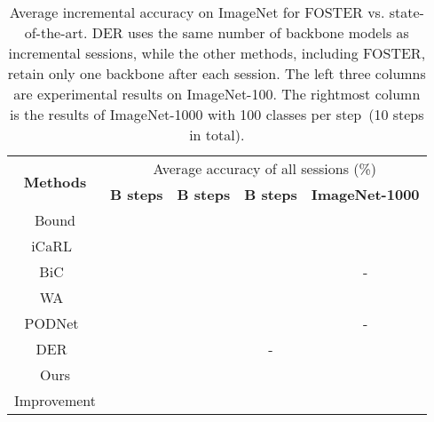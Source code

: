 \documentclass[runningheads]{llncs}
\begin{document}
\begin{table}[t]
\centering
\caption{\small  Average incremental accuracy on ImageNet for FOSTER vs. state-of-the-art. DER uses the same number of backbone models as incremental sessions, while the other methods, including FOSTER, retain only one backbone after each session. The left three columns are experimental results on ImageNet-100. The rightmost column is the results of ImageNet-1000 with 100 classes per step~(10 steps in total).}
\label{tab:ImageNet}

\setlength{\tabcolsep}{2mm}
\begin{tabular}{ccccc} 
\hline
\multirow{2}{*}{\textbf{Methods}} & \multicolumn{4}{c}{Average accuracy of all sessions  (\%)}                                                                                                      \\ 
\cline{2-5}
                                  & \textbf{B  steps}        & \textbf{B  steps}                        & \textbf{B  steps}        & \textbf{ImageNet-1000}            \\ 
\hline
Bound                             &                          &                                           &                           &                            \\ 
\hline
iCaRL~\cite{icarl}                           &                          &                                           &                           &                             \\
BiC~\cite{bic}                              &                          &                                           &                           & -                                 \\
WA~\cite{WA}                              &                           &                                           &                          &                            \\
PODNet~\cite{douillard2020podnet}                           &                          &                                           &                           & -                                 \\
DER~\cite{der}                              &                          &                                           & -                                &                            \\ 
\hline
Ours                              &                 &                                  &                  &                   \\
Improvement            &  &  &  &  \\\hline
\end{tabular}
\end{table}
\end{document}
